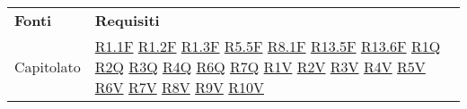 
\begin{center}
    \centering
    \renewcommand{\arraystretch}{1.8}
    \label{tab:FontiRequisiti}
    \begin{longtable}[!h]{m{50px} m{50px}}
        \rowcolor{logo!70} \textbf{Fonti} & \textbf{Requisiti}                         \\
        Capitolato                        & \hyperref[tab:RequisitiFunzionali]{R1.1F}
        \newline \hyperref[tab:RequisitiFunzionali]{R1.2F}
        \newline \hyperref[tab:RequisitiFunzionali]{R1.3F}
        \newline \hyperref[tab:RequisitiFunzionali]{R5.5F}
        \newline \hyperref[tab:RequisitiFunzionali]{R8.1F}
        \newline \hyperref[tab:RequisitiFunzionali]{R13.5F}
        \newline \hyperref[tab:RequisitiFunzionali]{R13.6F}
        \newline \hyperref[tab:RequisitiQualita]{R1Q}
        \newline \hyperref[tab:RequisitiQualita]{R2Q}
        \newline \hyperref[tab:RequisitiQualita]{R3Q}
        \newline \hyperref[tab:RequisitiQualita]{R4Q}
        \newline \hyperref[tab:RequisitiQualita]{R6Q}
        \newline \hyperref[tab:RequisitiQualita]{R7Q}
        \newline \hyperref[tab:RequisitiVincolo]{R1V}
        \newline \hyperref[tab:RequisitiVincolo]{R2V}
        \newline \hyperref[tab:RequisitiVincolo]{R3V}
        \newline \hyperref[tab:RequisitiVincolo]{R4V}
        \newline \hyperref[tab:RequisitiVincolo]{R5V}
        \newline \hyperref[tab:RequisitiVincolo]{R6V}
        \newline \hyperref[tab:RequisitiVincolo]{R7V}
        \newline \hyperref[tab:RequisitiVincolo]{R8V}
        \newline \hyperref[tab:RequisitiVincolo]{R9V}
        \newline \hyperref[tab:RequisitiVincolo]{R10V}

\end{longtable}
\end{center}
